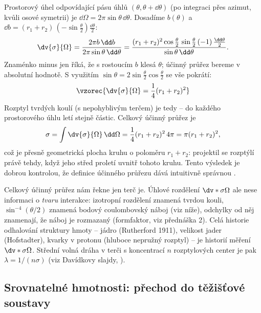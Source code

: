 Prostorový úhel odpovídající pásu úhlů $(\theta,\theta+\dd\theta)$ (po integraci přes azimut, kvůli osové symetrii) je $\dd\Omega = 2\pi\sin\theta\,\dd\theta$. Dosadíme $b(\theta)$ a $\dd b = (r_1+r_2)\,(-\sin\tfrac{\theta}{2})\tfrac{\dd\theta}{2}$:
\begin{equation}
  \dv{\sigma}{\Omega} = \frac{2\pi b\,\dd b}{2\pi\sin\theta\,\dd\theta}
  = \frac{(r_1+r_2)^2 \cos\frac{\theta}{2}\,\sin\frac{\theta}{2}\,(-1)\,\frac{\dd\theta}{2}}{\sin\theta\,\dd\theta}.
\end{equation}
Znaménko minus jen říká, že s rostoucím $b$ klesá $\theta$; účinný průřez bereme v absolutní hodnotě. S využitím $\sin\theta = 2\sin\frac{\theta}{2}\cos\frac{\theta}{2}$ se vše pokrátí:
\begin{equation}
  \vzorec{\dv{\sigma}{\Omega} = \frac14 (r_1+r_2)^2}
\end{equation}
Rozptyl tvrdých koulí (s nepohyblivým terčem) je tedy  -- do každého prostorového úhlu letí stejně částic. Celkový účinný průřez je
\begin{equation}
  \sigma = \int \dv{\sigma}{\Omega}\,\dd\Omega = \frac14 (r_1+r_2)^2\, 4\pi = \pi (r_1+r_2)^2 ,
\end{equation}
což je přesně geometrická plocha kruhu o poloměru $r_1+r_2$: projektil se rozptýlí právě tehdy, když jeho střed proletí uvnitř tohoto kruhu. Tento výsledek je dobrou kontrolou, že definice účinného průřezu dává intuitivně správnou .

\begin{vysvetleni}
Celkový účinný průřez nám řekne jen  terč je. Úhlové rozdělení $\dv*{\sigma}{\Omega}$ ale nese informaci o \emph{tvaru} interakce: izotropní rozdělení znamená tvrdou kouli, $\sin^{-4}(\theta/2)$ znamená bodový coulombovský náboj (viz níže), odchylky od něj znamenají, že náboj je rozmazaný (formfaktor, viz přednáška 2). Celá historie odhalování struktury hmoty -- jádro (Rutherford 1911), velikost jader (Hofstadter), kvarky v protonu (hluboce nepružný rozptyl) -- je historií měření $\dv*{\sigma}{\Omega}$. Střední volná dráha v terči s koncentrací $n$ rozptylových center je pak $\lambda = 1/(n\sigma)$ (viz Davídkovy slajdy, ).
\end{vysvetleni}

\subsection{Srovnatelné hmotnosti: přechod do těžišťové soustavy}

